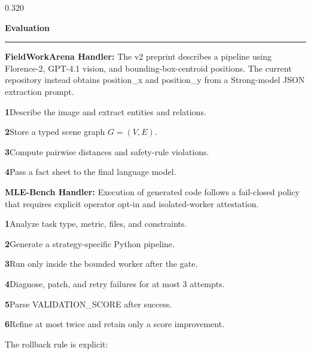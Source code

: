 \documentclass{beamer}
\newenvironment{possection}[2]{%
  \par\vspace{0.10cm}%
  \noindent{\color{ncgreendark}\bfseries\large #1}\hspace{0.42em}%
  {\color{ncink}\bfseries\large #2}\par\vspace{-0.20cm}%
  \noindent\textcolor{ncline}{\rule{\linewidth}{0.9pt}}\par\vspace{0cm}%
  \begin{minipage}{\linewidth}%
}{%
  \end{minipage}\par\vspace{0.40cm}%
}
\newcommand{\heil}[1]{{\color{ncink}\bfseries #1:}\hspace{0.3em}}
\newcommand{\stp}[1]{{\ttfamily\bfseries\color{ncgreendark}#1}}
\newcommand{\apicode}[1]{{\ttfamily\small #1}}
\begin{document}
\begin{frame}[t]
\begin{columns}[t,onlytextwidth]
\begin{column}{0.320\textwidth}
  \begin{possection}{4.}{Evaluation}
    \fontsize{31}{33}\selectfont
    \heil{FieldWorkArena Handler} The v2 preprint describes a pipeline using
    Florence-2, GPT-4.1 vision, and bounding-box-centroid positions. The current
    repository instead obtains \apicode{position\_x} and
    \apicode{position\_y} from a Strong-model JSON extraction prompt.
    \par\vspace{0.12cm}
    \stp{1}\hspace{0.45em}Describe the image and extract entities and relations.\par
    \stp{2}\hspace{0.45em}Store a typed scene graph $G=(V,E)$.\par
    \stp{3}\hspace{0.45em}Compute pairwise distances and safety-rule violations.\par
    \stp{4}\hspace{0.45em}Pass a fact sheet to the final language model.\par
    \par\vspace{0.18cm}
    \heil{MLE-Bench Handler} Execution of generated code follows a fail-closed
    policy that requires explicit operator opt-in and isolated-worker
    attestation.
    \par\vspace{0.12cm}
    \stp{1}\hspace{0.45em}Analyze task type, metric, files, and constraints.\par
    \stp{2}\hspace{0.45em}Generate a strategy-specific Python pipeline.\par
    \stp{3}\hspace{0.45em}Run only inside the bounded worker after the gate.\par
    \stp{4}\hspace{0.45em}Diagnose, patch, and retry failures for at most 3 attempts.\par
    \stp{5}\hspace{0.45em}Parse \apicode{VALIDATION\_SCORE} after success.\par
    \stp{6}\hspace{0.45em}Refine at most twice and retain only a score improvement.\par
    \vspace{0.08cm}
    The rollback rule is explicit:
    \begin{equation}

\end{equation}
\end{possection}
\end{column}
\end{columns}
\end{frame}
\end{document}
